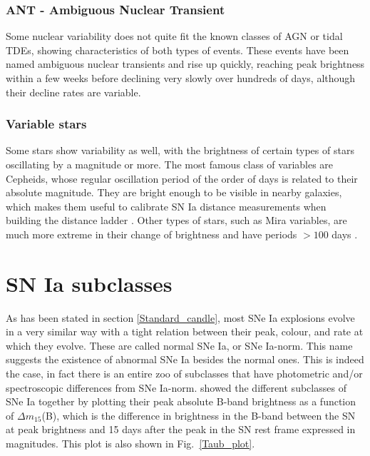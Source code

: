 \documentclass[a4paper,oneside,12pt, class=Latex/Classes/PhDthesisPSnPDF, crop=false]{standalone}
\begin{document}
\subsubsection{ANT - Ambiguous Nuclear Transient}
Some nuclear variability does not quite fit the known classes of AGN or tidal TDEs, showing characteristics of both types of events. These events have been named ambiguous nuclear transients \citep[ANTS;][]{Kankare_ANT, 2020ohl_Hinkle, Hinkle_MIR_ANT_echo, Hinkle_Extreme_nuclear_transients/ANTs, wiseman_ztfants} and rise up quickly, reaching peak brightness within a few weeks before declining very slowly over hundreds of days, although their decline rates are variable.


\subsubsection{Variable stars}
Some stars show variability as well, with the brightness of certain types of stars oscillating by a magnitude or more. The most famous class of variables are Cepheids, whose regular oscillation period of the order of days is related to their absolute magnitude. They are bright enough to be visible in nearby galaxies, which makes them useful to calibrate SN Ia distance measurements when building the distance ladder \citep{Cepheids_Gibson, Cepheids_Saha}. Other types of stars, such as Mira variables, are much more extreme in their change of brightness and have periods $>100$ days \citep{Mira_varibs}.


\section{SN Ia subclasses}
As has been stated in section \ref{Standard_candle}, most SNe Ia explosions evolve in a very similar way with a tight relation between their peak, colour, and rate at which they evolve. These are called normal SNe Ia, or SNe Ia-norm. This name suggests the existence of abnormal SNe Ia besides the normal ones. This is indeed the case, in fact there is an entire zoo of subclasses that have photometric and/or spectroscopic differences from SNe Ia-norm. \citet{Taubenberger_plot} showed the different subclasses of SNe Ia together by plotting their peak absolute B-band brightness as a function of $\Delta m_{15}$(B), which is the difference in brightness in the B-band between the SN at peak brightness and 15 days after the peak in the SN rest frame expressed in magnitudes. This plot is also shown in Fig.~\ref{Taub_plot}.
\end{document}
